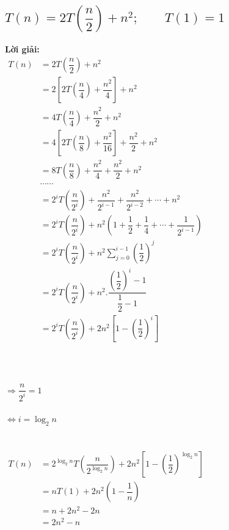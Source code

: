 \documentclass[12pt, letterpaper]{article}
\begin{document}
\subsection{$T(n) = 2T(\dfrac{n}{2}) + n^2; \quad \quad T(1) = 1$}
\textbf{Lời giải:} \\
$ \begin{aligned}
		T(n) & = 2T(\dfrac{n}{2}) + n^2                                                                    \\
		     & = 2[2T(\dfrac{n}{4}) + \dfrac{n^2}{4}] + n^2                                                \\
		     & = 4T(\dfrac{n}{4}) + \dfrac{n^2}{2} + n^2                                                   \\
		     & = 4[2T(\dfrac{n}{8}) + \dfrac{n^2}{16}] + \dfrac{n^2}{2} + n^2                              \\
		     & = 8T(\dfrac{n}{8}) + \dfrac{n^2}{4} + \dfrac{n^2}{2} + n^2                                  \\
		     & \cdots \cdots                                                                               \\
		     & = 2^iT(\dfrac{n}{2^i}) + \dfrac{n^2}{2^{i-1}} + \dfrac{n^2}{2^{i-2}} + \cdots + n^2         \\
		     & = 2^iT(\dfrac{n}{2^i}) + n^2(1 + \dfrac{1}{2} + \dfrac{1}{4} + \cdots + \dfrac{1}{2^{i-1}}) \\
		     & = 2^iT(\dfrac{n}{2^i}) + n^2 \sum_{j=0}^{i-1} (\dfrac{1}{2})^j                              \\
		     & = 2^iT(\dfrac{n}{2^i}) + n^2 . \dfrac{(\dfrac{1}{2})^i - 1}{\dfrac{1}{2} - 1}               \\
		     & = 2^iT(\dfrac{n}{2^i}) + 2n^2 [1 - (\dfrac{1}{2})^i]                                        \\
	\end{aligned} $ \\ \\ \\
 \\
$\Rightarrow \dfrac{n}{2^i} = 1$ \\ \\
$\Leftrightarrow i = \log_2{n}$ \\ \\
 \\
$ \begin{aligned}
		T(n) & = 2^{\log_2{n}}T(\dfrac{n}{2^{\log_2{n}}}) + 2n^2[1 - (\dfrac{1}{2})^{\log_2{n}}] \\
		     & = nT(1) + 2n^2(1 - \dfrac{1}{n})                                                  \\
		     & = n + 2n^2 - 2n                                                                   \\
		     & = 2n^2 - n
	\end{aligned} $\\
\end{document}
